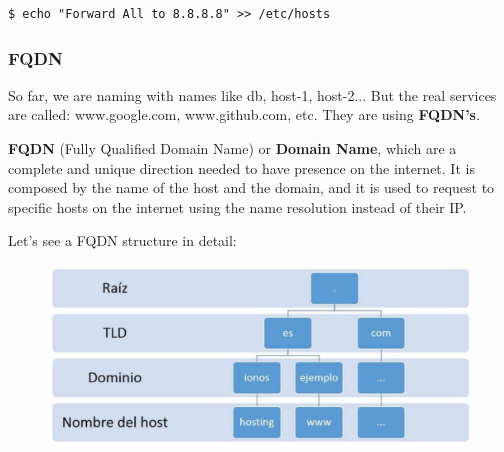 \documentclass{article}
\newenvironment{codetemplate}[1][]{%
  \mybasecolorbox[#1]
  \itshape
}{%
  \endmybasecolorbox
}
\begin{document}
\begin{codetemplate}{}
\begin{verbatim}
$ echo "Forward All to 8.8.8.8" >> /etc/hosts
\end{verbatim}
\end{codetemplate}

\subsubsection{FQDN}

So far, we are naming with names like db, host-1, host-2... But the real services are called: www.google.com, www.github.com, etc. They are using \textbf{FQDN's}.

\textbf{FQDN} (Fully Qualified Domain Name) or \textbf{Domain Name}, which are a complete and unique direction needed to have presence on the internet. It is composed by the name of the host and the domain, and it is used to request to specific hosts on the internet using the name resolution instead of their IP.

Let's see a FQDN structure in detail:

\begin{figure}[H]
    \centering
    \includegraphics[scale=0.4]{pictures/image11.PNG}
\end{figure}
\end{document}
